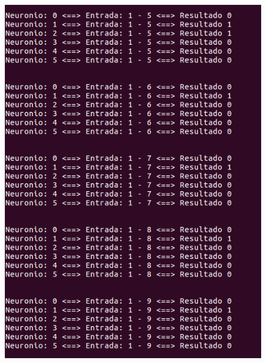 \documentclass[hidelinks,12pt]{article}
\begin{document}
		\begin{figure}[!h]
			\centering
			\includegraphics[scale=0.5]{Figures/E3S1P2.png}
		\end{figure}
		
\end{document}
